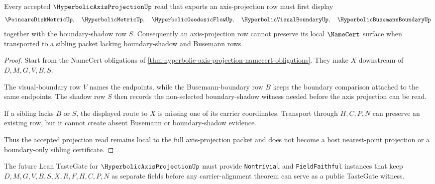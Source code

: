 \begin{theorem}
\label{thm:hyperbolic-axis-projection-boundary-dependency}
Every accepted $\HyperbolicAxisProjectionUp$ read that exports an axis-projection row must first display
$$
\PoincareDiskMetricUp,\quad \HyperbolicMetricUp,\quad \HyperbolicGeodesicFlowUp,\quad \HyperbolicVisualBoundaryUp,\quad \HyperbolicBusemannBoundaryUp
$$
together with the boundary-shadow row $S$. Consequently an axis-projection row cannot preserve its local $\NameCert$ surface when transported to a sibling packet lacking boundary-shadow and Busemann rows.
\end{theorem}
\begin{proof}
Start from the NameCert obligations of \autoref{thm:hyperbolic-axis-projection-namecert-obligations}. They make $X$ downstream of $D,M,G,V,B,S$.

The visual-boundary row $V$ names the endpoints, while the Busemann-boundary row $B$ keeps the boundary comparison attached to the same endpoints. The shadow row $S$ then records the non-selected boundary-shadow witness needed before the axis projection can be read.

If a sibling lacks $B$ or $S$, the displayed route to $X$ is missing one of its carrier coordinates. Transport through $H,C,P,N$ can preserve an existing row, but it cannot create absent Busemann or boundary-shadow evidence.

Thus the accepted projection read remains local to the full axis-projection packet and does not become a host nearest-point projection or a boundary-only sibling certificate.
\end{proof}



The future Lean TasteGate for $\HyperbolicAxisProjectionUp$ must provide \texttt{Nontrivial} and \texttt{FieldFaithful} instances that keep $D,M,G,V,B,S,X,R,F,H,C,P,N$ as separate fields before any carrier-alignment theorem can serve as a public TasteGate witness.

